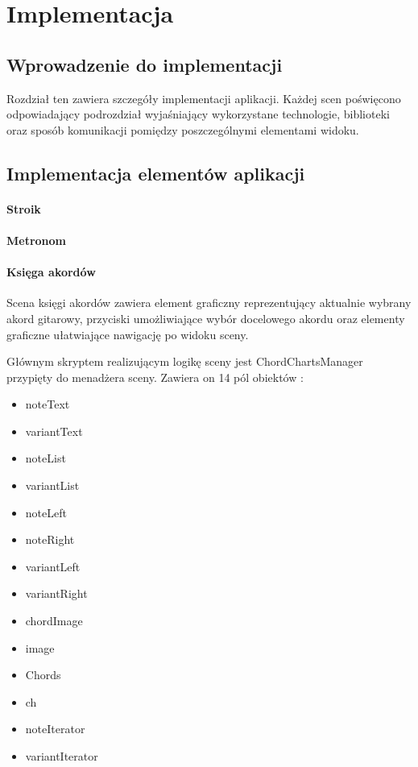 \chapter{Implementacja}

\section{Wprowadzenie do implementacji}

Rozdział ten zawiera szczegóły implementacji aplikacji. Każdej scen poświęcono odpowiadający podrozdział wyjaśniający wykorzystane technologie, biblioteki oraz sposób komunikacji pomiędzy poszczególnymi elementami widoku. 

\section{Implementacja elementów aplikacji}


\subsubsection{Stroik}
                                                                                                                                                              
\subsubsection{Metronom}

\subsubsection{Księga akordów}

Scena księgi akordów zawiera element graficzny reprezentujący aktualnie wybrany akord gitarowy, przyciski umożliwiające wybór docelowego akordu oraz elementy graficzne ułatwiające nawigację po widoku sceny.

Głównym skryptem realizującym logikę sceny jest ChordChartsManager przypięty do menadżera sceny. Zawiera on 14 pól obiektów :

\begin{itemize}
    \item noteText
    \item variantText
    \item noteList
    \item variantList
    \item noteLeft
    \item noteRight
    \item variantLeft
    \item variantRight
    \item chordImage
    \item image
    \item Chords
    \item ch
    \item noteIterator
    \item variantIterator
\end{itemize}

